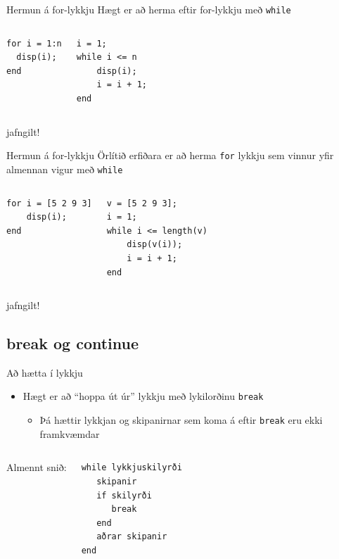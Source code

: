 \documentclass{beamer}
\begin{document}
\begin{frame}[fragile]{Hermun á for-lykkju}
\vspace{\baselineskip}
Hægt er að herma eftir for-lykkju með \texttt{while}
\begin{columns}
\begin{verbatim}
for i = 1:n
  disp(i);
end
\end{verbatim}
\begin{verbatim}
i = 1;
while i <= n
    disp(i);
    i = i + 1;
end
\end{verbatim}
\end{columns}
\begin{center}
jafngilt!
\end{center}
\end{frame}

\begin{frame}[fragile]{Hermun á for-lykkju}
\vspace{\baselineskip}
Örlítið erfiðara er að herma \texttt{for} lykkju sem vinnur yfir almennan vigur með \texttt{while}
\begin{columns}
\begin{verbatim}
for i = [5 2 9 3]
    disp(i);
end
\end{verbatim}
\begin{verbatim}
v = [5 2 9 3];
i = 1;
while i <= length(v)
    disp(v(i));
    i = i + 1;
end
\end{verbatim}
\end{columns}
\begin{center}
jafngilt!
\end{center}
\end{frame}

\subsection{break og continue}

\begin{frame}[fragile]{Að hætta í lykkju}
\vspace{\baselineskip}
\begin{itemize}
 \item Hægt er að ``hoppa út úr'' lykkju með lykilorðinu \texttt{break}
 \begin{itemize}
  \item Þá hættir lykkjan og skipanirnar sem koma á eftir \texttt{break} eru ekki framkvæmdar
 \end{itemize}
\end{itemize}
\begin{columns}
Almennt snið:
\begin{verbatim}
while lykkjuskilyrði
   skipanir
   if skilyrði
      break
   end
   aðrar skipanir
end
\end{verbatim}
\end{columns}
\end{frame}
\end{document}

